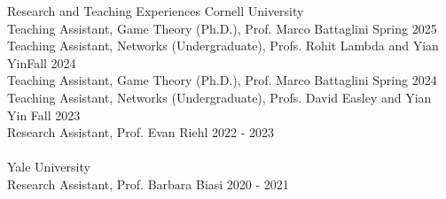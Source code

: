 \documentclass{resume} %
\begin{document}

\begin{rSection}{Research and Teaching Experiences}
Cornell University \\
\-\hspace{1em} Teaching Assistant, Game Theory (Ph.D.), Prof. Marco Battaglini \hfill Spring 2025 \\
\-\hspace{1em} Teaching Assistant, Networks (Undergraduate), Profs. Rohit Lambda and Yian Yin\hfill Fall 2024 \\
\-\hspace{1em} Teaching Assistant, Game Theory (Ph.D.), Prof. Marco Battaglini \hfill Spring 2024 \\
\-\hspace{1em} Teaching Assistant, Networks (Undergraduate), Profs. David Easley and Yian Yin \hfill Fall 2023 \\
\-\hspace{1em} Research Assistant, Prof. Evan Riehl \hfill 2022 - 2023 \\
\\
Yale University \\
\-\hspace{1em} Research Assistant, Prof. Barbara Biasi \hfill 2020 - 2021
\end{rSection}







\end{document}
